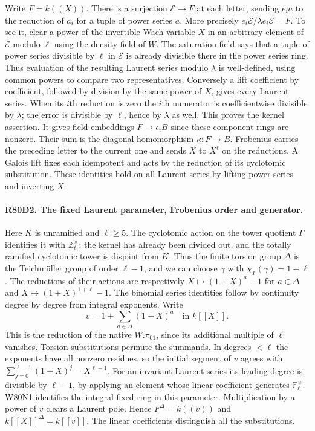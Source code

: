 Write $F=k((X))$. There is a surjection
$\mathcal E\to F$ at each letter, sending $e_i a$ to the
reduction of $a_i$ for a tuple of power series $a$. More precisely
$e_i\mathcal E/\lambda e_i\mathcal E=F$. To see it, clear a
power of the invertible Wach variable $X$ in an arbitrary element
of $\mathcal E$ modulo $\ell$ using the density field of $W$.
The saturation field says that a tuple of power series divisible
by $\ell$ in $\mathcal E$ is already divisible there in the
power series ring. Thus evaluation of the resulting Laurent
series modulo $\lambda$ is well-defined, using common powers to
compare two representatives. Conversely a lift coefficient by
coefficient, followed by division by the same power of $X$, gives
every Laurent series. When its $i$th reduction is zero the
$i$th numerator is coefficientwise divisible by $\lambda$;
the error is divisible by $\ell$, hence by $\lambda$ as well.
This proves the kernel assertion. It gives field embeddings
$F\to\epsilon_i B$ since these component rings are nonzero.
Their sum is the diagonal homomorphism $\kappa:F\to B$.
Frobenius carries the preceding letter to the current one and
sends $X$ to $X^\ell$ on the reductions. A Galois lift fixes
each idempotent and acts by the reduction of its cyclotomic
substitution. These identities hold on all Laurent series by
lifting power series and inverting $X$.

\paragraph{R80D2. The fixed Laurent parameter, Frobenius order and generator.}
Here $K$ is unramified and $\ell\ge5$. The cyclotomic action
on the tower quotient $\Gamma$ identifies it with
$\mathbb Z_\ell^\times$: the kernel has already been divided
out, and the totally ramified cyclotomic tower is disjoint from
$K$. Thus the finite torsion group $\Delta$ is the Teichm\"uller
group of order $\ell-1$, and we can choose $\gamma$ with
$\chi_\Gamma(\gamma)=1+\ell$. The reductions of their actions
are respectively $X\mapsto(1+X)^a-1$ for $a\in\Delta$ and
$X\mapsto(1+X)^{1+\ell}-1$. The binomial series identities
follow by continuity degree by degree from integral exponents.
Write
\[
        v=1+\sum_{a\in\Delta}(1+X)^a\quad\text{in }k[[X]].
\]
This is the reduction of the native $W.\pi_{01}$, since its
additional multiple of $\ell$ vanishes. Torsion substitutions
permute the summands. In degrees $<\ell$ the exponents have all
nonzero residues, so the initial segment of $v$ agrees with
$\sum_{j=0}^{\ell-1}(1+X)^j=X^{\ell-1}$. For an invariant
Laurent series its leading degree is divisible by $\ell-1$,
by applying an element whose linear coefficient generates
$\mathbb F_\ell^\times$. W80N1 identifies the integral fixed ring in this parameter.
Multiplication by a power of $v$ clears a Laurent pole. Hence
$F^\Delta=k((v))$ and $k[[X]]^\Delta=k[[v]]$.
The linear coefficients distinguish all the substitutions.

